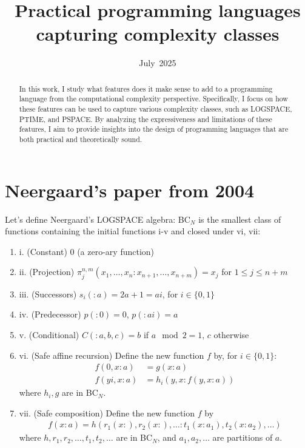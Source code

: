 \documentclass[en]  {pracamgr}
\title{Practical programming languages capturing complexity classes}
\date{July~2025}
\begin{document}
\hypersetup{pageanchor=false}
\maketitle

\begin{abstract}
  In this work, I study what features does it make sense to add to a programming language
  from the computational complexity perspective. Specifically, I focus on how these features can be used to capture various complexity classes, such as LOGSPACE, PTIME, and PSPACE. By analyzing the expressiveness and limitations of these features, I aim to provide insights into the design of programming languages that are both practical and theoretically sound.
\end{abstract}

\hypersetup{pageanchor=true}
\tableofcontents

\chapter*{Neergaard's paper from 2004}

Let's define Neergaard's LOGSPACE algebra: BC$_N$ is the smallest class
of functions containing the initial functions i-v and closed under vi, vii:
\begin{enumerate}
  \item i. (Constant) 0 (a zero-ary function)
  \item ii. (Projection) $\pi_j^{n, m}(x_1, \dots, x_n : x_{n+1}, \dots, x_{n+m}) = x_j$ for $1 \leq j \leq n+m$
  \item iii. (Successors) $s_i(:a) = 2a + 1 = ai$, for $i \in \{0, 1\}$
  \item iv. (Predecessor) $p(: 0) = 0$, $p(: ai) = a$
  \item v. (Conditional) $C(: a, b, c) = b$ if $a \mod 2 = 1$, $c$ otherwise
  \item vi. (Safe affine recursion) Define the new function $f$ by, for $i \in \{0, 1\}$:
        \begin{align*}
          f(0, x: a)  & = g(x:a)                 \\
          f(yi, x: a) & = h_i(y, x: f(y, x : a))
        \end{align*}
        where $h_i, g$ are in BC$_N$.
  \item vii. (Safe composition) Define the new function $f$ by
        \begin{align*}
          f(x : a) = h(r_1(x:), r_2(x:), \dots : t_1(x : a_1), t_2(x : a_2), \dots)
        \end{align*}
        where $h, r_1, r_2, \dots, t_1, t_2, \dots$ are in BC$_N$, and $a_1, a_2, \dots$ are partitions of $a$.
\end{enumerate}
\end{document}
